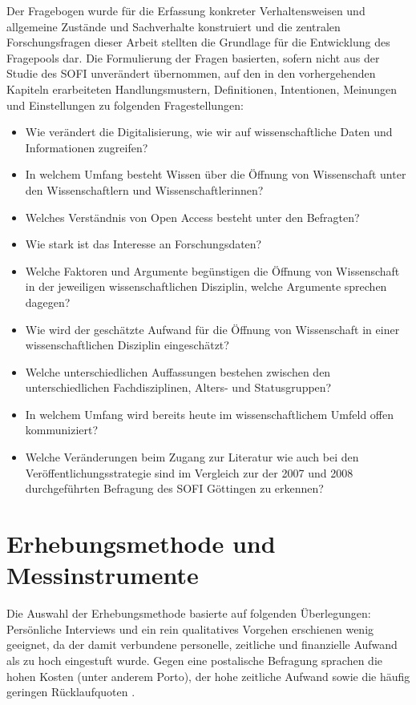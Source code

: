 Der Fragebogen wurde für die Erfassung konkreter Verhaltensweisen und allgemeine Zustände und Sachverhalte \cite{raab_2012_fragebogen} konstruiert und die zentralen Forschungsfragen dieser Arbeit stellten die Grundlage für die Entwicklung des Fragepools dar. Die Formulierung der Fragen basierten, sofern nicht aus der Studie des SOFI unverändert übernommen, auf den in den vorhergehenden Kapiteln erarbeiteten Handlungsmustern, Definitionen, Intentionen, Meinungen und Einstellungen zu folgenden Fragestellungen:
\begin{itemize}
\item Wie verändert die Digitalisierung, wie wir auf wissenschaftliche Daten und Informationen zugreifen?
\item In welchem Umfang besteht Wissen über die Öffnung von Wissenschaft unter den Wissenschaftlern und Wissenschaftlerinnen?
\item Welches Verständnis von Open Access besteht unter den Befragten?
\item Wie stark ist das Interesse an Forschungsdaten?
\item Welche Faktoren und Argumente begünstigen die Öffnung von Wissenschaft in der jeweiligen wissenschaftlichen Disziplin, welche Argumente sprechen dagegen?
\item Wie wird der geschätzte Aufwand für die Öffnung von Wissenschaft in einer wissenschaftlichen Disziplin eingeschätzt?
\item Welche unterschiedlichen Auffassungen bestehen zwischen den unterschiedlichen Fachdisziplinen, Alters- und Statusgruppen?
\item In welchem Umfang wird bereits heute im wissenschaftlichem Umfeld offen kommuniziert?
\item Welche Veränderungen beim Zugang zur Literatur wie auch bei den Veröffentlichungsstrategie sind im Vergleich zur der 2007 und 2008 durchgeführten Befragung des SOFI Göttingen zu erkennen?
\end{itemize}

\section{Erhebungsmethode und Messinstrumente}

Die Auswahl der Erhebungsmethode basierte auf folgenden Überlegungen: Persönliche Interviews und ein rein qualitatives Vorgehen erschienen wenig geeignet, da der damit verbundene personelle, zeitliche und finanzielle Aufwand als zu hoch eingestuft wurde. Gegen eine postalische Befragung sprachen die hohen Kosten (unter anderem Porto), der hohe zeitliche Aufwand sowie die häufig geringen Rücklaufquoten \cite{suchen}.

